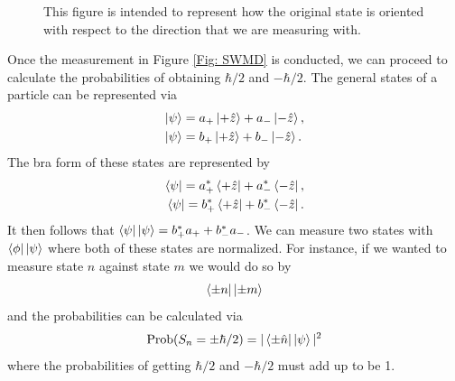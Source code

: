 \documentclass[twocolumn]{article}
\begin{document}
\begin{figure}[ht]
    \centering
    \caption{\footnotesize{This figure is intended to represent how the original state is oriented with respect to the direction that we are measuring with.}}
    \label{Fig: SWMNG}
\end{figure}
\par \noindent
Once the measurement in Figure \ref{Fig: SWMD} is conducted, we can proceed to calculate the probabilities of obtaining $\hbar/2$ and $-\hbar/2$. The general states of a particle can be represented via
\begin{align} \label{Eq: GPS}
\ket{\psi}&=a_{+}\ket{+\hat{z}}+a_{-}\ket{-\hat{z}}, \\
\ket{\psi}&=b_{+}\ket{+\hat{z}}+b_{-}\ket{-\hat{z}}. \nonumber
\end{align}
The bra form of these states are represented by
\begin{align}\label{Eq: BF}
\bra{\psi}=a_{+}^*\bra{+\hat{z}}+a_{-}^*\bra{-\hat{z}}, \\
\bra{\psi}=b_{+}^*\bra{+\hat{z}}+b_{-}^*\bra{-\hat{z}}. \nonumber
\end{align}
It then follows that $\bra{\psi}\ket{\psi}=b_{+}^*a_{+}+b_{-}^*a_{-}$. We can measure two states with $\bra{\phi}\ket{\psi}$ where both of these states are normalized. For instance, if we wanted to measure state $n$ against state $m$ we would do so by
\begin{equation} \label{Eq: SAS}
\bra{\pm n}\ket{\pm m}
\end{equation}
and the probabilities can be calculated via
\begin{equation} \label{Eq: PC}
\text{Prob}(S_n=\pm \hbar/2)=|\bra{\pm\hat{n}}\ket{\psi}|^2
\end{equation}
where the probabilities of getting $\hbar/2$ and $-\hbar/2$ must add up to be 1. 
\end{document}
